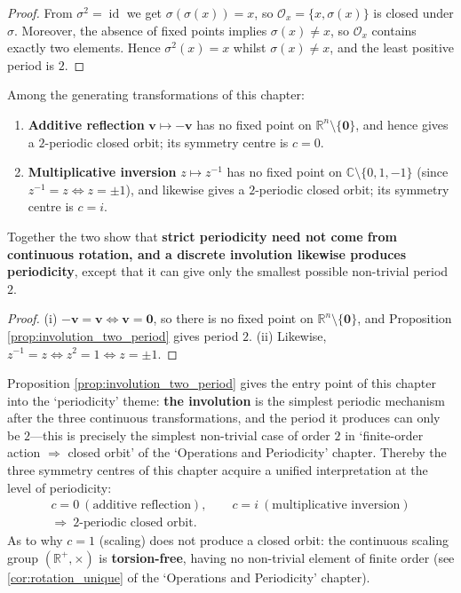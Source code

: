\begin{proof}
From $\sigma^2=\operatorname{id}$ we get $\sigma(\sigma(x))=x$, so $\mathcal{O}_x=\{x,\sigma(x)\}$ is closed under $\sigma$. Moreover, the absence of fixed points implies $\sigma(x)\neq x$, so $\mathcal{O}_x$ contains exactly two elements. Hence $\sigma^2(x)=x$ whilst $\sigma(x)\neq x$, and the least positive period is $2$.
\end{proof}

\begin{corollary}\label{cor:reflection_two_period}
Among the generating transformations of this chapter:
\begin{enumerate}[label=(\roman*)]
    \item \textbf{Additive reflection} $\mathbf{v}\mapsto-\mathbf{v}$ has no fixed point on $\mathbb{R}^n\setminus\{\mathbf{0}\}$, and hence gives a $2$-periodic closed orbit; its symmetry centre is $c=0$.
    \item \textbf{Multiplicative inversion} $z\mapsto z^{-1}$ has no fixed point on $\mathbb{C}\setminus\{0,1,-1\}$ (since $z^{-1}=z\iff z=\pm1$), and likewise gives a $2$-periodic closed orbit; its symmetry centre is $c=i$.
\end{enumerate}
Together the two show that \textbf{strict periodicity need not come from continuous rotation, and a discrete involution likewise produces periodicity}, except that it can give only the smallest possible non-trivial period $2$.
\end{corollary}

\begin{proof}
(i) $-\mathbf{v}=\mathbf{v}\iff\mathbf{v}=\mathbf{0}$, so there is no fixed point on $\mathbb{R}^n\setminus\{\mathbf{0}\}$, and Proposition \ref{prop:involution_two_period} gives period $2$.
(ii) Likewise, $z^{-1}=z\iff z^2=1\iff z=\pm1$.
\end{proof}

\begin{remark}\label{rem:vector_two_period_interface}
Proposition \ref{prop:involution_two_period} gives the entry point of this chapter into the `periodicity' theme: \textbf{the involution} is the simplest periodic mechanism after the three continuous transformations, and the period it produces can only be $2$---this is precisely the simplest non-trivial case of order $2$ in `finite-order action $\Rightarrow$ closed orbit' of the `Operations and Periodicity' chapter. Thereby the three symmetry centres of this chapter acquire a unified interpretation at the level of periodicity:
\[
\begin{gathered}c=0\ (\text{additive reflection}),\qquad c=i\ (\text{multiplicative inversion})\\\Longrightarrow\ \text{2-periodic closed orbit}.\end{gathered}
\]
As to why $c=1$ (scaling) does not produce a closed orbit: the continuous scaling group $(\mathbb{R}^+,\times)$ is \textbf{torsion-free}, having no non-trivial element of finite order (see \cref{cor:rotation_unique} of the `Operations and Periodicity' chapter).
\end{remark}


